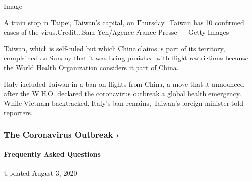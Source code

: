 Image

A train stop in Taipei, Taiwan's capital, on Thursday.~Taiwan has 10
confirmed cases of the virus.Credit...Sam Yeh/Agence France-Presse ---
Getty Images

Taiwan, which is self-ruled but which China claims is part of its
territory, complained on Sunday that it was being punished with flight
restrictions because the World Health Organization considers it part of
China.

Italy included Taiwan in a ban on flights from China, a move that it
announced after the W.H.O.
\href{https://www.nytimes.com/2020/01/30/health/coronavirus-world-health-organization.html}{declared
the coronavirus outbreak a global health emergency}. While Vietnam
backtracked, Italy's ban remains, Taiwan's foreign minister told
reporters.

\href{https://www.nytimes.com/news-event/coronavirus?action=click\&pgtype=Article\&state=default\&region=MAIN_CONTENT_3\&context=storylines_faq}{}

\hypertarget{the-coronavirus-outbreak-}{%
\subsubsection{The Coronavirus Outbreak
›}\label{the-coronavirus-outbreak-}}

\hypertarget{frequently-asked-questions}{%
\paragraph{Frequently Asked
Questions}\label{frequently-asked-questions}}

Updated August 3, 2020

